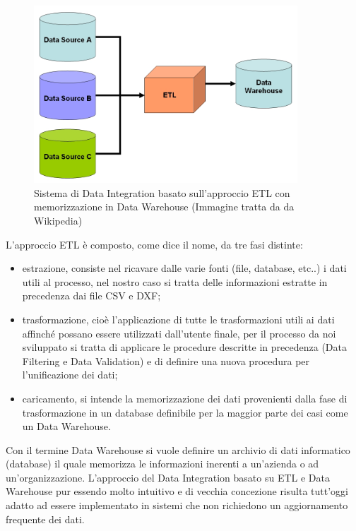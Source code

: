 \documentclass[12pt]{report}
\begin{document}
\begin{figure}[H]
    \centering
    \includegraphics[width=280pt]{ETL+Datawarehouse.jpg}
    \caption{Sistema di Data Integration basato sull'approccio ETL con memorizzazione in Data Warehouse (Immagine tratta da da Wikipedia\cite{Integration-Wiki})}
    \label{fig:ETL_Datawarehouse}
\end{figure}

\vspace{5mm} %

L'approccio ETL è composto, come dice il nome, da tre fasi distinte:
\begin{itemize}
\item estrazione, consiste nel ricavare dalle varie fonti (file, database, etc..) i dati utili al processo, nel nostro caso si tratta delle informazioni estratte in precedenza dai file CSV e DXF;
\item trasformazione, cioè l'applicazione di tutte le trasformazioni utili ai dati affinché possano essere utilizzati dall'utente finale, per il processo da noi sviluppato si tratta di applicare le procedure descritte in precedenza (Data Filtering e Data Validation) e di definire una nuova procedura per l'unificazione dei dati;
\item caricamento, si intende la memorizzazione dei dati provenienti dalla fase di trasformazione in un database definibile per la maggior parte dei casi come un Data Warehouse.
\end{itemize}

\newpage

Con il termine Data Warehouse si vuole definire un archivio di dati informatico (database) il quale memorizza le informazioni inerenti a un'azienda o ad un'organizzazione.
L'approccio del Data Integration basato su ETL e Data Warehouse pur essendo molto intuitivo e di vecchia concezione risulta tutt'oggi adatto ad essere implementato in sistemi che non richiedono un aggiornamento frequente dei dati.
\end{document}
